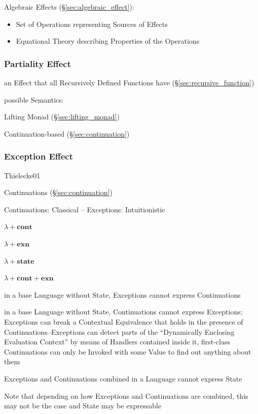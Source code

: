 Algebraic Effects (\S\ref{sec:algebraic_effect}):
\begin{itemize}
  \item Set of Operations representing Sources of Effects
  \item Equational Theory describing Properties of the Operations
\end{itemize}



\subsubsection{Partiality Effect}\label{sec:partiality_effect}

an Effect that all Recursively Defined Functions have
(\S\ref{sec:recursive_function})

possible Semantics:

Lifting Monad (\S\ref{sec:lifting_monad})

Continuation-based (\S\ref{sec:continuation})



\subsubsection{Exception Effect}\label{sec:exception_effect}

Thielecke01

Continuations (\S\ref{sec:continuation})

Continuations: Classical -- Exceptions: Intuitionistic

$\lambda + \mathbf{cont}$

$\lambda + \mathbf{exn}$

$\lambda + \mathbf{state}$

$\lambda + \mathbf{cont} + \mathbf{exn}$

in a base Language without State, Exceptions cannot express Continuations

in a base Language without State, Continuations cannot express Exceptions;
Exceptions can break a Contextual Equivalence that holds in the presence of
Continuations--Exceptions can detect parts of the ``Dynamically Enclosing
Evaluation Context'' by means of Handlers contained inside it, first-class
Continuations can only be Invoked with some Value to find out anything about
them

Exceptions and Continuations combined in a Language cannot express State

\fist Note that depending on how Exceptions and Continuations are combined, this
may not be the case and State may be expressable

